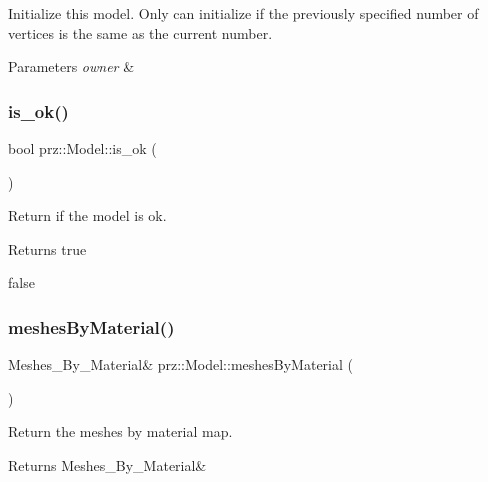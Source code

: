 Initialize this model. Only can initialize if the previously specified number of vertices is the same as the current number. 


\begin{DoxyParams}{Parameters}
{\em owner} & \\
\hline
\end{DoxyParams}
\mbox{\label{classprz_1_1_model_a16fda70601dfe40015b6d593aae2b71b}} 
\subsubsection{\texorpdfstring{is\_ok()}{is\_ok()}}
{\footnotesize\ttfamily bool prz\+::\+Model\+::is\+\_\+ok (\begin{DoxyParamCaption}{ }\end{DoxyParamCaption})\hspace{0.3cm}{\ttfamily [inline]}}



Return if the model is ok. 

\begin{DoxyReturn}{Returns}
true 

false 
\end{DoxyReturn}
\mbox{\label{classprz_1_1_model_abc463fe1a08047ad01acc0ac3771c595}} 
\subsubsection{\texorpdfstring{meshesByMaterial()}{meshesByMaterial()}}
{\footnotesize\ttfamily Meshes\+\_\+\+By\+\_\+\+Material\& prz\+::\+Model\+::meshes\+By\+Material (\begin{DoxyParamCaption}{ }\end{DoxyParamCaption})\hspace{0.3cm}{\ttfamily [inline]}}



Return the meshes by material map. 

\begin{DoxyReturn}{Returns}
Meshes\+\_\+\+By\+\_\+\+Material\& 
\end{DoxyReturn}
\mbox{\label{classprz_1_1_model_aa9a4c5370ebe94b8d34c83e7b6317239}} 
